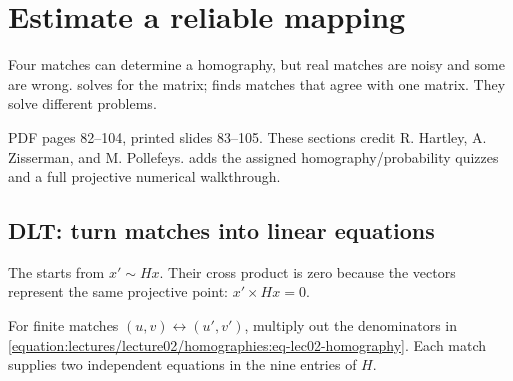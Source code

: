 \documentclass[letterpaper,11pt,english,openany,oneside]{jupyterBook}
\begin{document}
\ignorespaces
{}\ignorespaces
\sphinxstepscope


\section{Estimate a reliable mapping}
\label{\detokenize{lectures/lecture02/estimation:estimate-a-reliable-mapping}}\label{\detokenize{lectures/lecture02/estimation:lec02-estimation}}\label{\detokenize{lectures/lecture02/estimation::doc}}
\sphinxAtStartPar
Four matches can determine a homography, but real matches are noisy and some are wrong.  solves for the matrix;  finds matches that agree with one matrix. They solve different problems.

\sphinxAtStartPar
{} PDF pages 82–104, printed slides 83–105. These sections credit R. Hartley, A. Zisserman, and M. Pollefeys. {\hyperref[\detokenize{lectures/lecture03/index::doc}]{}} adds the assigned homography/probability quizzes and a full projective numerical walkthrough.


\subsection{DLT: turn matches into linear equations}
\label{\detokenize{lectures/lecture02/estimation:dlt-turn-matches-into-linear-equations}}
\sphinxAtStartPar
The  starts from \(x'\sim Hx\). Their cross product is zero because the vectors represent the same projective point: \(x'\times Hx=0\).

\sphinxAtStartPar
For finite matches \((u,v)\leftrightarrow(u',v')\), multiply out the denominators in \eqref{equation:lectures/lecture02/homographies:eq-lec02-homography}. Each match supplies two independent equations in the nine entries of \(H\).
\end{document}

